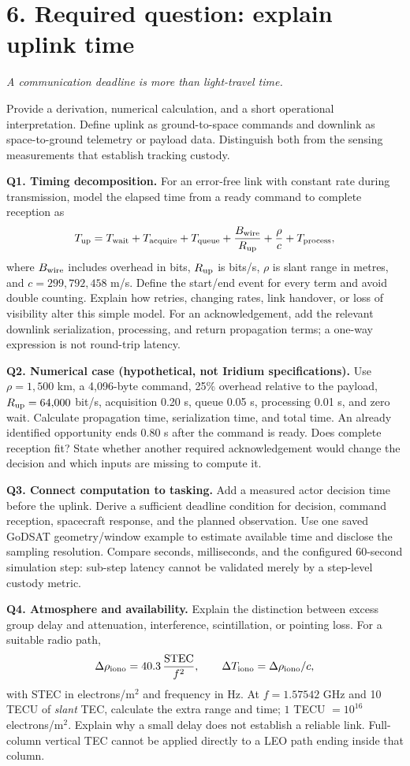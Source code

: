 \documentclass[11pt,letterpaper]{article}
\newcommand{\pageheading}[2]{\section*{\color{navy}#1}\textit{#2}\par}
\begin{document}
\newpage
\pageheading{6. Required question: explain uplink time}{A communication deadline is more than light-travel time.}
Provide a derivation, numerical calculation, and a short operational interpretation. Define uplink as ground-to-space commands and downlink as space-to-ground telemetry or payload data. Distinguish both from the sensing measurements that establish tracking custody.

\textbf{Q1. Timing decomposition.} For an error-free link with constant rate during transmission, model the elapsed time from a ready command to complete reception as
\[
T_{\rm up}=T_{\rm wait}+T_{\rm acquire}+T_{\rm queue}
+\frac{B_{\rm wire}}{R_{\rm up}}+\frac{\rho}{c}+T_{\rm process},
\]
where $B_{\rm wire}$ includes overhead in bits, $R_{\rm up}$ is bits/s, $\rho$ is slant range in metres, and $c=299{,}792{,}458$ m/s. Define the start/end event for every term and avoid double counting. Explain how retries, changing rates, link handover, or loss of visibility alter this simple model. For an acknowledgement, add the relevant downlink serialization, processing, and return propagation terms; a one-way expression is not round-trip latency.

\textbf{Q2. Numerical case (hypothetical, not Iridium specifications).} Use $\rho=1{,}500$ km, a 4,096-byte command, 25\% overhead relative to the payload, $R_{\rm up}=64{,}000$ bit/s, acquisition 0.20 s, queue 0.05 s, processing 0.01 s, and zero wait. Calculate propagation time, serialization time, and total time. An already identified opportunity ends 0.80 s after the command is ready. Does complete reception fit? State whether another required acknowledgement would change the decision and which inputs are missing to compute it.

\textbf{Q3. Connect computation to tasking.} Add a measured actor decision time before the uplink. Derive a sufficient deadline condition for decision, command reception, spacecraft response, and the planned observation. Use one saved GoDSAT geometry/window example to estimate available time and disclose the sampling resolution. Compare seconds, milliseconds, and the configured 60-second simulation step: sub-step latency cannot be validated merely by a step-level custody metric.

\textbf{Q4. Atmosphere and availability.} Explain the distinction between excess group delay and attenuation, interference, scintillation, or pointing loss. For a suitable radio path,
\[
\Delta \rho_{\rm iono}=40.3\,\frac{\mathrm{STEC}}{f^2},\qquad
\Delta T_{\rm iono}=\Delta \rho_{\rm iono}/c,
\]
with STEC in electrons/m$^2$ and frequency in Hz. At $f=1.57542$ GHz and 10 TECU of \emph{slant} TEC, calculate the extra range and time; $1$ TECU $=10^{16}$ electrons/m$^2$. Explain why a small delay does not establish a reliable link. Full-column vertical TEC cannot be applied directly to a LEO path ending inside that column.
\end{document}
